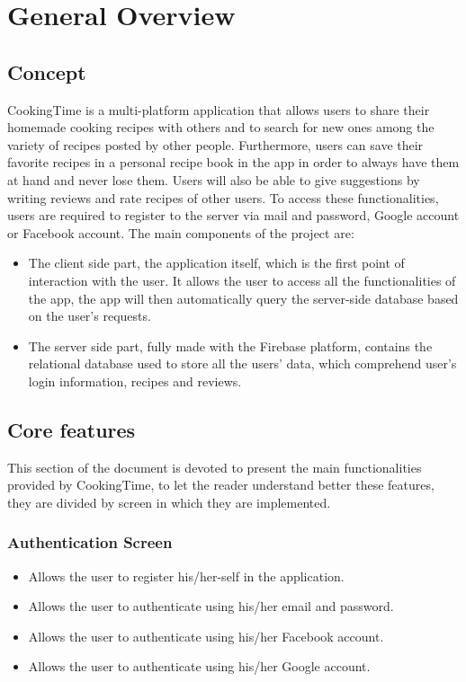 \chapter{General Overview}

\section{Concept}
	CookingTime is a multi-platform application that allows users to share their homemade cooking recipes with others and to search for new ones among the variety of recipes posted by other people.
	Furthermore, users can save their favorite recipes in a personal recipe book in the app in order to always have them at hand and never lose them.
	Users will also be able to give suggestions by writing reviews and rate recipes of other users.
	To access these functionalities, users are required to register to the server via mail and password, Google account or Facebook account.
	The main components of the project are:
	\begin{itemize}
		\item The client side part, the application itself, which is the first point of interaction with the user.
		It allows the user to access all the functionalities of the app, the app will then automatically query the server-side database based on the user's requests.
		
		\item The server side part, fully made with the Firebase platform, contains the relational database used to store all the users' data, which comprehend user's login information, recipes and reviews.
	\end{itemize}


\section{Core features}
	This section of the document is devoted to present the main functionalities provided by CookingTime, to let the reader understand better these features, 
	they are divided by screen in which they are implemented.
	
	\subsection{Authentication Screen}
		\begin{itemize}
			\item Allows the user to register his/her-self in the application.
		
			\item Allows the user to authenticate using his/her email and password.
			
			\item Allows the user to authenticate using his/her Facebook account.
			
			\item Allows the user to authenticate using his/her Google account.
		\end{itemize}

